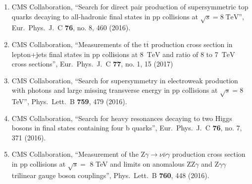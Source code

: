 \begin{enumerate}
\item CMS Collaboration, ``Search for direct pair production of supersymmetric top quarks decaying to all-hadronic final states in pp collisions at $\sqrt{s} = 8\;\text {TeV} $'', Eur.\ Phys.\ J.\ C {\bf 76}, no. 8, 460 (2016).

\item CMS Collaboration, ``Measurements of the $\mathrm{t}\overline{\mathrm{t}}$ production cross section in lepton+jets final states in pp collisions at 8 $\,\text {TeV}$ and ratio of 8 to 7  $\,\text {TeV}$ cross sections'', Eur.\ Phys.\ J.\ C {\bf 77}, no. 1, 15 (2017)

\item CMS Collaboration, ``Search for supersymmetry in electroweak production with photons and large missing transverse energy in pp collisions at $\sqrt s = 8$ TeV'', Phys.\ Lett.\ B {\bf 759}, 479 (2016).

\item CMS Collaboration, ``Search for heavy resonances decaying to two Higgs bosons in final states containing four b quarks'', Eur.\ Phys.\ J.\ C {\bf 76}, no. 7, 371 (2016).

\item CMS Collaboration, ``Measurement of the $ \mathrm{ Z } \gamma \rightarrow \nu \bar{\nu} \gamma$ production cross section in pp collisions at $\sqrt{s}=$ 8 TeV and limits on anomalous $ \mathrm{ ZZ } \gamma$ and $ \mathrm{Z} \gamma \gamma$ trilinear gauge boson couplings'', Phys.\ Lett.\ B {\bf 760}, 448 (2016).


\end{enumerate}
